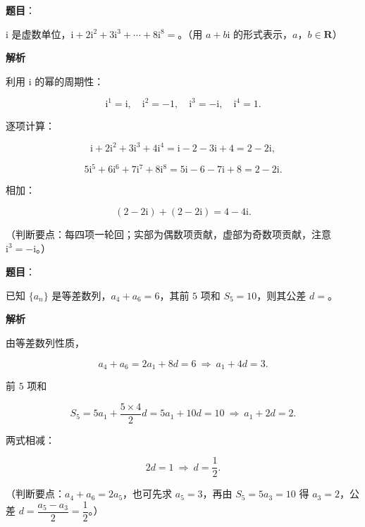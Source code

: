 \begin{answer}

\textbf{题目}：

$\mathrm i$ 是虚数单位，$\mathrm i+2\mathrm i^2+3\mathrm i^3+\cdots+8\mathrm i^8=$\gkblank{}。（用 $a+b\mathrm i$ 的形式表示，$a$，$b\in\mathbf R$）

\textbf{解析}

利用 $\mathrm i$ 的幂的周期性：

\nopagebreak[4]
\[\mathrm i^1=\mathrm i,\quad \mathrm i^2=-1,\quad \mathrm i^3=-\mathrm i,\quad \mathrm i^4=1.\]

逐项计算：

\nopagebreak[4]
\[\mathrm i+2\mathrm i^2+3\mathrm i^3+4\mathrm i^4=\mathrm i-2-3\mathrm i+4=2-2\mathrm i,\]

\nopagebreak[4]
\[5\mathrm i^5+6\mathrm i^6+7\mathrm i^7+8\mathrm i^8=5\mathrm i-6-7\mathrm i+8=2-2\mathrm i.\]

相加：

\nopagebreak[4]
\[(2-2\mathrm i)+(2-2\mathrm i)=4-4\mathrm i.\]

（判断要点：每四项一轮回；实部为偶数项贡献，虚部为奇数项贡献，注意 $\mathrm i^3=-\mathrm i$。）


\end{answer}
\begin{answer}

\textbf{题目}：

已知 $\{a_n\}$ 是等差数列，$a_4+a_6=6$，其前 $5$ 项和 $S_5=10$，则其公差 $d=$\gkblank{}。

\textbf{解析}

由等差数列性质，

\nopagebreak[4]
\[a_4+a_6=2a_1+8d=6\ \Rightarrow\ a_1+4d=3.\]

前 $5$ 项和

\nopagebreak[4]
\[S_5=5a_1+\frac{5\times4}{2}d=5a_1+10d=10\ \Rightarrow\ a_1+2d=2.\]

两式相减：

\nopagebreak[4]
\[2d=1\ \Rightarrow\ d=\frac12.\]

（判断要点：$a_4+a_6=2a_5$，也可先求 $a_5=3$，再由 $S_5=5a_3=10$ 得 $a_3=2$，公差 $d=\dfrac{a_5-a_3}{2}=\dfrac12$。）


\end{answer}
